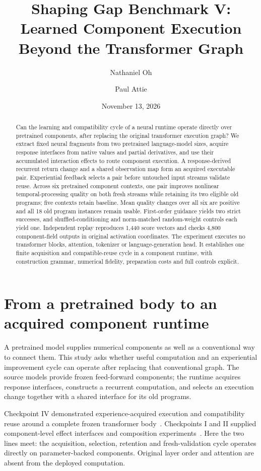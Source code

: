 \documentclass[11pt]{article}
\title{Shaping Gap Benchmark V:\\Learned Component Execution\\Beyond the Transformer Graph}
\author{Nathaniel Oh \and Paul Attie}
\date{November 13, 2026}
\begin{document}
\maketitle
\begin{abstract}
Can the learning and compatibility cycle of a neural runtime operate directly over pretrained components, after replacing the original transformer execution graph? We extract fixed neural fragments from two pretrained language-model sizes, acquire response interfaces from native values and partial derivatives, and use their accumulated interaction effects to route component execution. A response-derived recurrent return change and a shared observation map form an acquired executable pair. Experiential feedback selects a pair before untouched input streams validate reuse. Across six pretrained component contexts, one pair improves nonlinear temporal-processing quality on both fresh streams while retaining its two eligible old programs; five contexts retain baseline. Mean quality changes over all six are positive and all 18 old program instances remain usable. First-order guidance yields two strict successes, and shuffled-conditioning and norm-matched random-weight controls each yield one. Independent replay reproduces 1,440 score vectors and checks 4,800 component-field outputs in original activation coordinates. The experiment executes no transformer blocks, attention, tokenizer or language-generation head. It establishes one finite acquisition and compatible-reuse cycle in a component runtime, with construction grammar, numerical fidelity, preparation costs and full controls explicit.
\end{abstract}

\section{From a pretrained body to an acquired component runtime}
A pretrained model supplies numerical components as well as a conventional way to connect them. This study asks whether useful computation and an experiential improvement cycle can operate after replacing that conventional graph. The source models provide frozen feed-forward components; the runtime acquires response interfaces, constructs a recurrent computation, and selects an execution change together with a shared interface for its old programs.

Checkpoint IV demonstrated experience-acquired execution and compatibility reuse around a complete frozen transformer body~\cite{sg4}. Checkpoints I and II supplied component-level effect interfaces and composition experiments~\cite{sg1,sg2}. Here the two lines meet: the acquisition, selection, retention and fresh-validation cycle operates directly on parameter-backed components. Original layer order and attention are absent from the deployed computation.
\end{document}
